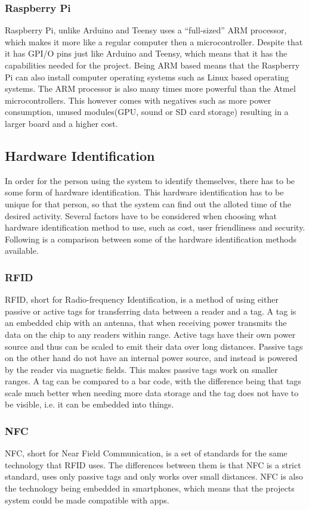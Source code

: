 \subsubsection{Raspberry Pi}
Raspberry Pi, unlike Arduino and Teensy uses a ``full-sized'' ARM processor, which makes it more like a regular computer then a microcontroller. Despite that it has GPI/O pins just like Arduino and Teensy, which means that it has the capabilities needed for the project. Being ARM based means that the Raspberry Pi can also install computer operating systems such as Linux based operating systems. The ARM processor is also many times more powerful than the Atmel microcontrollers. This however comes with negatives such as more power consumption, unused modules(GPU, sound or SD card storage) resulting in a larger board and a higher cost. 


\subsection{Hardware Identification}
In order for the person using the system to identify themselves, there has to be some form of hardware identification. This hardware identification has to be unique for that person, so that the system can find out the alloted time of the desired activity. Several factors have to be considered when choosing what hardware identification method to use, such as cost, user friendliness and security. Following is a comparison between some of the hardware identification methods available.

\subsubsection{RFID}
RFID, short for Radio-frequency Identification, is a method of using either passive or active tags for transferring data between a reader and a tag. A tag is an embedded chip with an antenna, that when receiving power transmits the data on the chip to any readers within range. Active tags have their own power source and thus can be scaled to emit their data over long distances. Passive tags on the other hand do not have an internal power source, and instead is powered by the reader via magnetic fields. This makes passive tags work on smaller ranges. A tag can be compared to a bar code, with the difference being that tags scale much better when needing more data storage and the tag does not have to be visible, i.e. it can be embedded into things.

\subsubsection{NFC}
NFC, short for Near Field Communication, is a set of standards for the same technology that RFID uses. The differences between them is that NFC is a strict standard, uses only passive tags and only works over small distances. NFC is also the technology being embedded in smartphones, which means that the projects system could be made compatible with apps.

